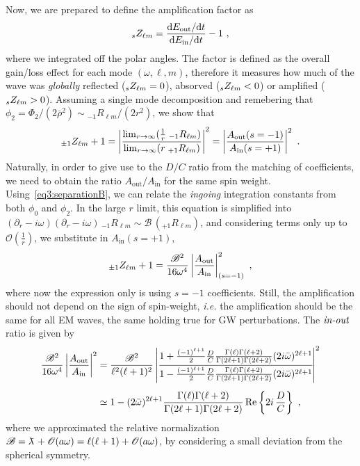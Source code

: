 Now, we are prepared to define the amplification factor as 
\begin{align}
    \uu[s]{Z}{\ell m} = \frac{\dd E_\mathrm{out} / \dd t}{\dd E_\mathrm{in} / \dd t} - 1 ~,
\end{align}
where we integrated off the polar angles.
The factor is defined as the overall gain/loss effect for each mode $(\omega,\ell,m)$, therefore it measures how much of the wave was \emph{globally} reflected ($\uu[s]{Z}{\ell m}=0$), absorved ($\uu[s]{Z}{\ell m}<0$) or amplified ($\uu[s]{Z}{\ell m}>0$).
Assuming a single mode decomposition and remebering that $\phi_2 = \Phi_2/(2 \bar{\rho}^2) \sim {}_{-1}R_{\ell m}/(2 r^2)$, we show that
\begin{align}
    \uu[\pm1]{Z}{\ell m} +1= \left| \frac{\lim_{r\to\infty} (\tfrac{1}{r} \; {}_{-1}R_{\ell m} )}{\lim_{r\to\infty} ( r \; {}_{+1}R_{\ell m} )} \right|^2 = \left| \frac{A_\mathrm{out}(s=-1)}{A_\mathrm{in}(s=+1)} \right|^2 ~.
\end{align}
Naturally, in order to give use to the $D/C$ ratio from the matching of coefficients, we need to obtain the ratio $A_\mathrm{out}/A_\mathrm{in}$ for the same spin weight.
Using~\eqref{eq3:separationB}, we can relate the \emph{ingoing} integration constants from both $\phi_0$ and $\phi_2$.
In the large $r$ limit, this equation is simplified into $(\partial_r-i \omega)(\partial_r-i \omega) \,{}_{-1}R_{\ell m} \sim \mathscr{B} \,( {}_{+1}R_{\ell m} )$, and considering terms only up to $\mathscr{O}(\tfrac{1}{r})$, we substitute in $A_\mathrm{in}(s=+1)$,
\begin{align}
    \uu[\pm1]{Z}{\ell m} +1 = \frac{\mathscr{B}^2}{16 \omega^4} \left| \frac{A_\mathrm{out}}{A_\mathrm{in} } \right|_{(s=-1)}^2 ~,
\end{align}
where now the expression only is using $s=-1$ coefficients.
Still, the amplification should not depend on the sign of spin-weight, \emph{i.e.} the amplification should be the same for all EM waves, the same holding true for GW perturbations.
The $\emph{in-out}$ ratio is given by
\begin{align}
    \begin{split}
        \frac{\mathscr{B}^2}{16 \omega^4} \left| \frac{A_\mathrm{out}}{A_\mathrm{in} } \right|^2 & = 
        \frac{\mathscr{B}^2}{\ell^2(\ell+1)^2} 
        \left|\cfrac{ 
            1+ \frac{(-1)^{\ell+1}}{2} \frac{D}{C} 
            \frac{\Gamma(\ell) \Gamma(\ell+2)}{\Gamma(2\ell+1) \Gamma(2\ell+2)} 
            (2 i\bar{\omega})^{2\ell+1}
            }{
            1 - \frac{(-1)^{\ell+1}}{2} \frac{D}{C}
            \frac{\Gamma(\ell) \Gamma(\ell+2)}{\Gamma(2\ell+1) \Gamma(2\ell+2)}
            (2 i\bar{\omega})^{2\ell+1}
        }\right|^2 \\[0.15cm]
        & \simeq  1 - (2 \bar{\omega})^{2\ell+1}
        \frac{\Gamma(\ell) \Gamma(\ell+2)}{\Gamma(2\ell+1) \Gamma(2\ell+2)} \,\Re\left\{2 i \,\frac{D}{C}\right\} ~,
    \end{split}
\end{align}
where we approximated the relative normalization $\mathscr{B} = \lambdabar + \mathscr{O}(a\omega) = \ell(\ell+1) + \mathscr{O}(a\omega)$, by considering a small deviation from the spherical symmetry.

